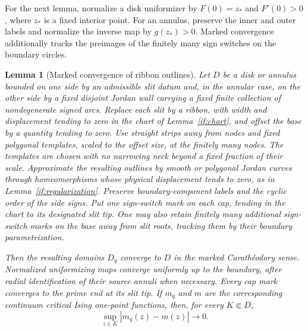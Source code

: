 \documentclass[11pt]{article}
\newtheorem{lemma}[theorem]{Lemma}
\theoremstyle{definition}
\theoremstyle{remark}
\numberwithin{equation}{section}
\begin{document}
For the next lemma, normalize a disk uniformizer by $F(0)=z_*$ and
$F'(0)>0$, where $z_*$ is a fixed interior point. For an annulus,
preserve the inner and outer labels and normalize the inverse map by
$g(z_*)>0$. Marked convergence additionally tracks the preimages of
the finitely many sign switches on the boundary circles.

\begin{lemma}[Marked convergence of ribbon outlines]
\label{if:marked-convergence}
Let $D$ be a disk or annulus bounded on one side by an admissible slit
datum and, in the annular case, on the other side by a fixed disjoint
Jordan wall carrying a fixed finite collection of nondegenerate signed
arcs.  Replace each slit by a ribbon, with width and displacement
tending to zero in the chart of Lemma~\ref{if:chart}, and offset the
base by a quantity tending to zero.  Use straight strips away from
nodes and fixed polygonal templates, scaled to the offset size, at
the finitely many nodes.  The templates are chosen with no narrowing
neck beyond a fixed fraction of their scale.  Approximate the resulting
outlines by smooth or polygonal Jordan curves through homeomorphisms
whose physical displacement tends to zero, as in
Lemma~\ref{if:regularization}.  Preserve boundary-component
labels and the cyclic order of the side signs.  Put one sign-switch
mark on each cap, tending in the chart to its designated slit tip.
One may also retain finitely many additional sign-switch marks on
the base away from slit roots, tracking them by their boundary
parametrization.

Then the resulting domains $D_q$ converge to $D$ in the marked
Carath\'eodory sense.  Normalized uniformizing maps converge uniformly
up to the boundary, after radial identification of their source annuli
when necessary.  Every cap mark converges to the prime end at its slit
tip.  If $m_q$ and $m$ are the corresponding continuum critical Ising
one-point functions, then, for every $K\Subset D$,
\begin{equation}\label{if:mean-continuity}
       \sup_{z\in K}|m_q(z)-m(z)|\longrightarrow0.
\end{equation}
\end{lemma}
\end{document}
